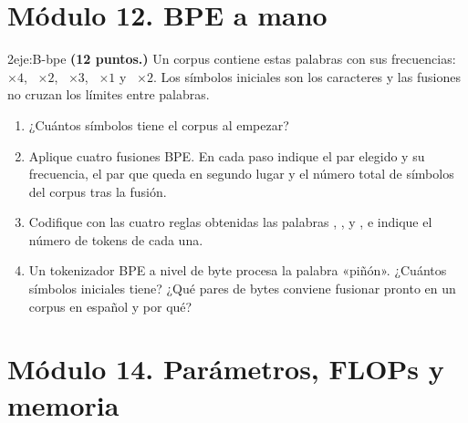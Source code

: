 \section*{Módulo 12. BPE a mano}

\begin{ejercicio}{2}{eje:B-bpe}
\textbf{(12 puntos.)} Un corpus contiene estas palabras con sus frecuencias: ~$\times 4$, ~$\times 2$, ~$\times 3$, ~$\times 1$ y ~$\times 2$. Los símbolos iniciales son los caracteres y las fusiones no cruzan los límites entre palabras.
\begin{enumerate}[label=(\alph*)]
  \item {} ¿Cuántos símbolos tiene el corpus al empezar?
  \item {} Aplique cuatro fusiones BPE. En cada paso indique el par elegido y su frecuencia, el par que queda en segundo lugar y el número total de símbolos del corpus tras la fusión.
  \item {} Codifique con las cuatro reglas obtenidas las palabras , ,  y , e indique el número de tokens de cada una.
  \item {} Un tokenizador BPE a nivel de byte procesa la palabra «piñón». ¿Cuántos símbolos iniciales tiene? ¿Qué pares de bytes conviene fusionar pronto en un corpus en español y por qué?
\end{enumerate}
\end{ejercicio}

\section*{Módulo 14. Parámetros, FLOPs y memoria}

